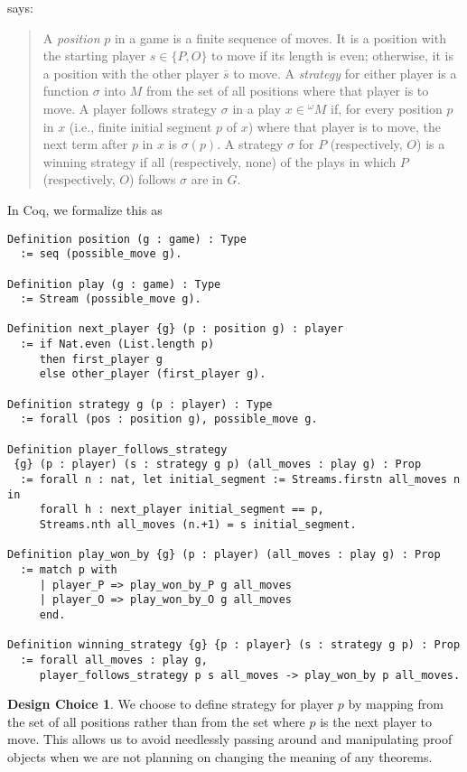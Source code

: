\documentclass{article}
\theoremstyle{definition}
\newtheorem*{designchoice}{Design Choice}
\begin{document}
\textcite[p.~187]{Blass1992} says: 
\begin{quote}
A \emph{position} $p$ in a game is a finite sequence of moves. It is a position with the starting player $s \in \{P, O\}$ to move if its length is even; otherwise, it is a position with the other player $\bar s$ to move. A \emph{strategy} for either player is a function $\sigma$ into $M$ from the set of all positions where that player is to move. A player follows strategy $\sigma$ in a play $x \in {}^\omega M$ if, for every position $p$ in $x$ (i.e., finite initial segment $p$ of $x$) where that player is to move, the next term after $p$ in $x$ is $\sigma (p)$. A strategy $\sigma$ for $P$ (respectively, $O$) is a winning strategy if all (respectively, none) of the plays in which $P$ (respectively, $O$) follows $\sigma$ are in $G$. 
\end{quote}

In Coq, we formalize this as
\begin{verbatim}
Definition position (g : game) : Type
  := seq (possible_move g).

Definition play (g : game) : Type
  := Stream (possible_move g).

Definition next_player {g} (p : position g) : player
  := if Nat.even (List.length p)
     then first_player g
     else other_player (first_player g).

Definition strategy g (p : player) : Type
  := forall (pos : position g), possible_move g.

Definition player_follows_strategy
 {g} (p : player) (s : strategy g p) (all_moves : play g) : Prop
  := forall n : nat, let initial_segment := Streams.firstn all_moves n in 
     forall h : next_player initial_segment == p, 
     Streams.nth all_moves (n.+1) = s initial_segment.

Definition play_won_by {g} (p : player) (all_moves : play g) : Prop
  := match p with
     | player_P => play_won_by_P g all_moves
     | player_O => play_won_by_O g all_moves
     end.

Definition winning_strategy {g} {p : player} (s : strategy g p) : Prop
  := forall all_moves : play g,
     player_follows_strategy p s all_moves -> play_won_by p all_moves. 
\end{verbatim}

\begin{designchoice}
We choose to define strategy for player $p$ by mapping from the set of all positions rather than from the set where $p$ is the next player to move. This allows us to avoid needlessly passing around and manipulating proof objects when we are not planning on changing the meaning of any theorems. 
\end{designchoice}
\end{document}
